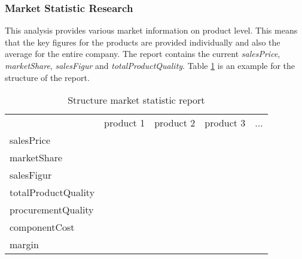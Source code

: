 \subsubsection{Market Statistic Research}
This analysis provides various market information on product level. This means that the key figures for the products are provided individually and also the average for the entire company. The report contains the current \textit{salesPrice}, \textit{marketShare}, \textit{salesFigur} and \textit{totalProductQuality}. Table \ref{MR_market_statistic} is an example for the structure of the report. \\

\begin{table}[ht]
\centering
\begin{tabular}{|l|r|r|r|r|}
\hline
                    & product 1   & product 2  & product 3 & ...       \\
salesPrice          &             &            &           &           \\
marketShare         &             &            &           &           \\
salesFigur          &             &            &           &           \\
totalProductQuality &             &            &           &           \\
procurementQuality  &             &            &           &           \\
componentCost       &             &            &           &           \\
margin              &             &            &           &           \\
\hline
\end{tabular}
\caption{Structure market statistic report}
\label{MR_market_statistic}
\end{table}